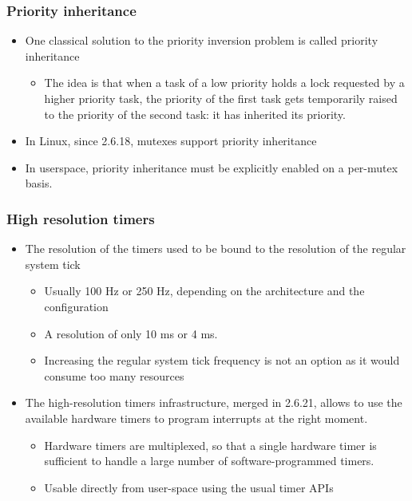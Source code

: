 \begin{frame}
  \frametitle{Priority inheritance}
  \begin{itemize}
  \item One classical solution to the priority inversion problem is
    called priority inheritance
    \begin{itemize}
    \item The idea is that when a task of a low priority holds a lock
      requested by a higher priority task, the priority of the first
      task gets temporarily raised to the priority of the second task:
      it has inherited its priority.
    \end{itemize}
  \item In Linux, since 2.6.18, mutexes support priority inheritance
  \item In userspace, priority inheritance must be explicitly enabled
    on a per-mutex basis.
  \end{itemize}
\end{frame}

\begin{frame}
  \frametitle{High resolution timers}
  \begin{itemize}
  \item The resolution of the timers used to be bound to the
    resolution of the regular system tick
    \begin{itemize}
    \item Usually 100 Hz or 250 Hz, depending on the architecture and
      the configuration
    \item A resolution of only 10 ms or 4 ms.
    \item Increasing the regular system tick frequency is not an
      option as it would consume too many resources
    \end{itemize}
  \item The high-resolution timers infrastructure, merged in 2.6.21,
    allows to use the available hardware timers to program interrupts
    at the right moment.
    \begin{itemize}
    \item Hardware timers are multiplexed, so that a single hardware
      timer is sufficient to handle a large number of
      software-programmed timers.
    \item Usable directly from user-space using the usual timer APIs
    \end{itemize}
  \end{itemize}
\end{frame}

